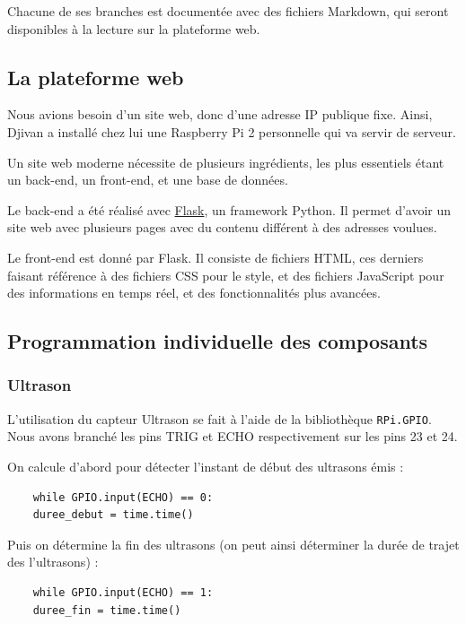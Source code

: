 \documentclass[a4paper,12pt]{report}  %
\begin{document}
Chacune de ses branches est documentée avec des fichiers Markdown, qui seront disponibles à la lecture sur la plateforme web. 



\subsection{La plateforme web}

Nous avions besoin d'un site web, donc d'une adresse IP publique fixe. Ainsi, Djivan a installé chez lui une Raspberry Pi 2 personnelle qui va servir de serveur. 

Un site web moderne nécessite de plusieurs ingrédients, les plus essentiels étant un back-end, un front-end, et une base de données. 

Le back-end a été réalisé avec \href{https://flask.palletsprojects.com/en/stable/}{Flask}, un framework Python. Il permet d'avoir un site web avec plusieurs pages avec du contenu différent à des adresses voulues. 

Le front-end est donné par Flask. Il consiste de fichiers HTML, ces derniers faisant référence à des fichiers CSS pour le style, et des fichiers JavaScript pour des informations en temps réel, et des fonctionnalités plus avancées. 

\subsection{Programmation individuelle des composants}

\subsubsection{Ultrason}

L’utilisation du capteur Ultrason se fait à l’aide de la bibliothèque \texttt{RPi.GPIO}.
Nous avons branché les pins TRIG et ECHO respectivement sur les pins 23 et 24.

On calcule d’abord pour détecter l’instant de début des ultrasons émis :
\begin{lstlisting}
	while GPIO.input(ECHO) == 0:   
	duree_debut = time.time()
\end{lstlisting}

Puis on détermine la fin des ultrasons (on peut ainsi déterminer la durée de trajet des l’ultrasons) :
\begin{lstlisting}
	while GPIO.input(ECHO) == 1:
	duree_fin = time.time()
\end{lstlisting}
\end{document}
